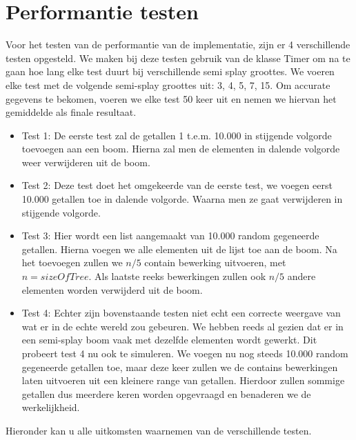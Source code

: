 \documentclass[dutch, 11pt]{report}
\begin{document}
\section*{Performantie testen}
Voor het testen van de performantie van de implementatie, zijn er 4 verschillende testen opgesteld. We maken bij deze testen gebruik van de klasse Timer om na te gaan hoe lang elke test duurt bij verschillende semi splay groottes. We voeren elke test met de volgende semi-splay groottes uit: 3, 4, 5, 7, 15. Om accurate gegevens te bekomen, voeren we elke test 50 keer uit en nemen we hiervan het gemiddelde als finale resultaat.
\begin{itemize}
	\item Test 1:  De eerste test zal de getallen 1 t.e.m. 10.000 in stijgende volgorde toevoegen aan een boom. Hierna zal men de elementen in dalende volgorde weer verwijderen uit de boom. 	
	\item Test 2: Deze test doet het omgekeerde van de eerste test, we voegen eerst 10.000 getallen toe in dalende volgorde. Waarna men ze gaat verwijderen in stijgende volgorde.
	\item Test 3: Hier wordt een list aangemaakt van 10.000 random gegeneerde getallen. Hierna voegen we alle elementen uit de lijst toe aan de boom. Na het toevoegen zullen we $n/5$ contain bewerking uitvoeren, met $n = sizeOfTree$. Als laatste reeks bewerkingen zullen ook $n/5$ andere elementen worden verwijderd uit de boom.
	\item Test 4: Echter zijn bovenstaande testen niet echt een correcte weergave van wat er in de echte wereld zou gebeuren. We hebben reeds al gezien dat er in een semi-splay boom vaak met dezelfde elementen wordt gewerkt. Dit probeert test 4 nu ook te simuleren. We voegen nu nog steeds 10.000 random gegeneerde getallen toe, maar deze keer zullen we de contains bewerkingen laten uitvoeren uit een kleinere range van getallen. Hierdoor zullen sommige getallen dus meerdere keren worden opgevraagd en benaderen we de werkelijkheid.
\end{itemize}

Hieronder kan u alle uitkomsten waarnemen van de verschillende testen.
\end{document}
